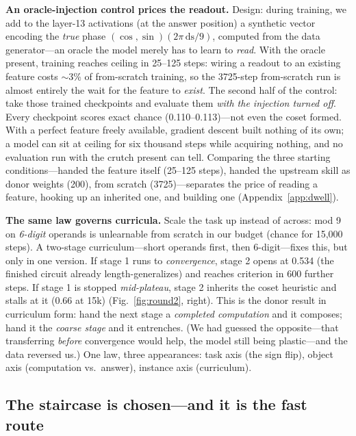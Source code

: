 \documentclass{article} %
\begin{document}
\textbf{An oracle-injection control prices the readout.} Design: during training, we add to the layer-13 activations (at the answer position) a synthetic vector encoding the \emph{true} phase $(\cos,\sin)(2\pi\,\mathrm{ds}/9)$, computed from the data generator---an oracle the model merely has to learn to \emph{read}. With the oracle present, training reaches ceiling in 25--125 steps: wiring a readout to an existing feature costs $\sim$3\% of from-scratch training, so the 3725-step from-scratch run is almost entirely the wait for the feature to \emph{exist}. The second half of the control: take those trained checkpoints and evaluate them \emph{with the injection turned off}. Every checkpoint scores exact chance (0.110--0.113)---not even the coset formed. With a perfect feature freely available, gradient descent built nothing of its own; a model can sit at ceiling for six thousand steps while acquiring nothing, and no evaluation run with the crutch present can tell. Comparing the three starting conditions---handed the feature itself (25--125 steps), handed the upstream skill as donor weights (200), from scratch (3725)---separates the price of reading a feature, hooking up an inherited one, and building one (Appendix~\ref{app:dwell}).

\textbf{The same law governs curricula.} Scale the task up instead of across: mod 9 on \emph{6-digit} operands is unlearnable from scratch in our budget (chance for 15{,}000 steps). A two-stage curriculum---short operands first, then 6-digit---fixes this, but only in one version. If stage 1 runs to \emph{convergence}, stage 2 opens at 0.534 (the finished circuit already length-generalizes) and reaches criterion in 600 further steps. If stage 1 is stopped \emph{mid-plateau}, stage 2 inherits the coset heuristic and stalls at it (0.66 at 15k) (Fig.~\ref{fig:round2}, right). This is the donor result in curriculum form: hand the next stage a \emph{completed computation} and it composes; hand it the \emph{coarse stage} and it entrenches. (We had guessed the opposite---that transferring \emph{before} convergence would help, the model still being plastic---and the data reversed us.) One law, three appearances: task axis (the sign flip), object axis (computation vs.\ answer), instance axis (curriculum).

\subsection{The staircase is chosen---and it is the fast route}
\end{document}
